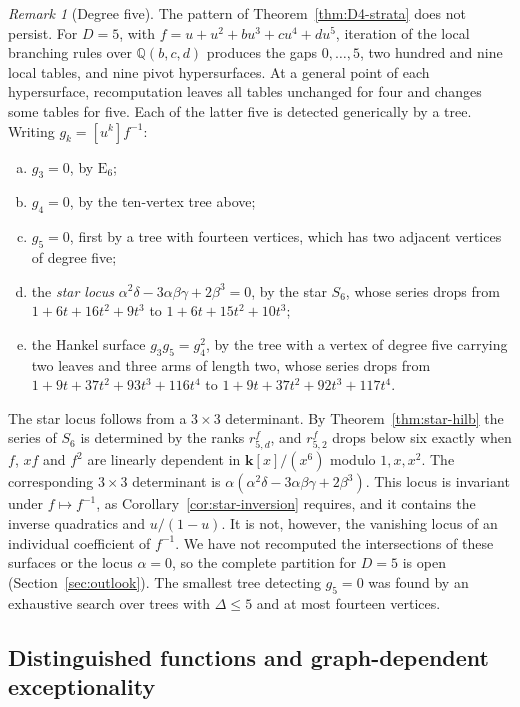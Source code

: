 \documentclass[reqno]{article}
\theoremstyle{plain} %
\theoremstyle{definition}
\theoremstyle{remark}
\newtheorem{remark}[theorem]{\sc Remark}
\newcommand{\K} {\mathbf{k}}
\numberwithin{equation}{section}
\begin{document}
\begin{remark}[Degree five]\label{rem:D5}
The pattern of Theorem~\ref{thm:D4-strata} does not persist. For $D=5$,
with $f=u+u^2+bu^3+cu^4+du^5$, iteration of the local branching rules
over $\mathbb{Q}(b,c,d)$ produces the gaps $0,\ldots,5$, two hundred
and nine local tables, and nine pivot hypersurfaces. At a general point of each hypersurface, recomputation leaves all tables
unchanged for four and changes some tables for five. Each of the latter
five is detected generically by a tree. Writing
$g_k=[u^k]f^{-1}$:
\begin{enumerate}[(a)]
\item $g_3=0$, by $\mathrm E_6$;
\item $g_4=0$, by the ten-vertex tree above;
\item $g_5=0$, first by a tree with fourteen vertices, which has two
adjacent vertices of degree five;
\item the \emph{star locus} $\alpha^2\delta-3\alpha\beta\gamma+2\beta^3=0$,
by the star $S_6$, whose series drops from $1+6t+16t^2+9t^3$ to
$1+6t+15t^2+10t^3$;
\item the Hankel surface $g_3g_5=g_4^2$, by the tree with a vertex of
degree five carrying two leaves and three arms of length two, whose series
drops from $1+9t+37t^2+93t^3+116t^4$ to $1+9t+37t^2+92t^3+117t^4$.
\end{enumerate}
The star locus follows from a $3\times3$ determinant. By Theorem~\ref{thm:star-hilb} the
series of $S_6$ is determined by the ranks $r^f_{5,d}$, and $r^f_{5,2}$
drops below six exactly when $f$, $xf$ and $f^2$ are linearly dependent
in $\K[x]/(x^6)$ modulo $1,x,x^2$. The corresponding $3\times3$
determinant is $\alpha(\alpha^2\delta-3\alpha\beta\gamma+2\beta^3)$.
This locus is invariant under $f\mapsto f^{-1}$, as
Corollary~\ref{cor:star-inversion} requires, and it contains the inverse
quadratics and $u/(1-u)$. It is not, however, the vanishing locus of an individual coefficient of
$f^{-1}$. We have not recomputed the intersections of these surfaces or
the locus $\alpha=0$, so the complete partition for $D=5$ is open
(Section~\ref{sec:outlook}). The smallest tree detecting $g_5=0$ was found
by an exhaustive search over trees with $\Delta\le5$ and at most fourteen
vertices.
\end{remark}

\subsection{Distinguished functions and graph-dependent exceptionality}
\label{sec:exceptional-functions}
\end{document}
